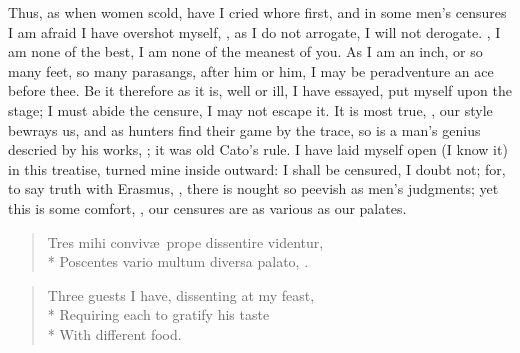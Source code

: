{Thus, as when women scold, have I cried whore first, and in some men's
censures I am afraid I have overshot myself, , as I do not arrogate, I will not derogate. , I am none of the best, I am none of the
meanest of you. As I am an inch, or so many feet, so many parasangs,
after him or him, I may be peradventure an ace before thee. Be it
therefore as it is, well or ill, I have essayed, put myself upon the
stage; I must abide the censure, I may not escape it. It is most true,
, our style bewrays us, and as hunters find
their game by the trace, so is a man's genius descried by his works,
;
it was old Cato's rule. I have laid myself open (I know it) in this
treatise, turned mine inside outward: I shall be censured, I doubt not;
for, to say truth with Erasmus, , there
is nought so peevish as men's judgments; yet this is some comfort, , our censures are as various as our palates.

\begin{latin}
\begin{verse}
Tres mihi conviv\ae{}\ prope dissentire videntur,\\*
Poscentes vario multum diversa palato, \etc.
\end{verse}
\end{latin}
\translationrule
\begin{verse}
Three guests I have, dissenting at my feast,\\*
Requiring each to gratify his taste\\*
With different food.
\end{verse}

}
